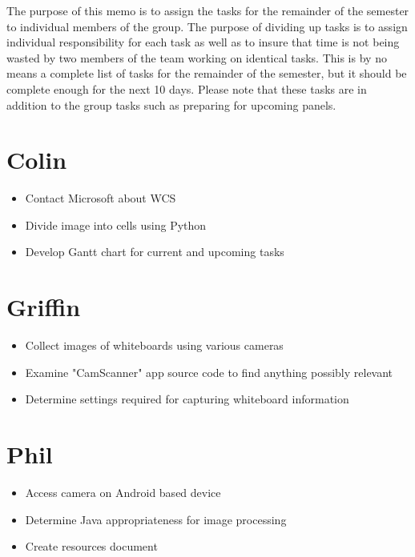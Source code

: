 \documentclass{texMemo}
\begin{document}
\maketitle
\noindent
The purpose of this memo is to assign the tasks for the remainder of the semester to individual members of the group. The purpose of dividing up tasks is to assign individual responsibility for each task as well as to insure that time is not being wasted by two members of the team working on identical tasks. This is by no means a complete list of tasks for the remainder of the semester, but it should be complete enough for the next 10 days. Please note that these tasks are in addition to the group tasks such as preparing for upcoming panels.  

		\section*{Colin}
			\begin{itemize}
				\item Contact Microsoft about WCS
				\item Divide image into cells using Python
				\item Develop Gantt chart for current and upcoming tasks
			\end{itemize}
		
		
		\section*{Griffin}
			\begin{itemize}
				\item Collect images of whiteboards using various cameras
				\item Examine "CamScanner" app source code to find anything possibly relevant
				\item Determine settings required for capturing whiteboard information
			\end{itemize}
		
		\section*{Phil}
			\begin{itemize}
				\item Access camera on Android based device
				\item Determine Java appropriateness for image processing
				\item Create resources document
			\end{itemize}
\end{document}
